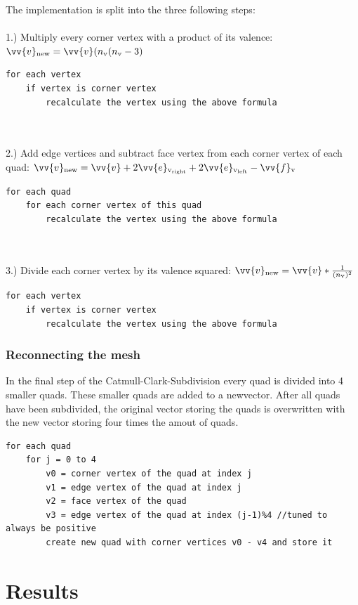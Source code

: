 \documentclass[12pt,a4paper]{scrartcl}
\begin{document}
The implementation is split into the three following steps:\\
\ \\
1.) Multiply every corner vertex with a product of its valence: $ \vv{v}\textsubscript{new} = \vv{v} (n\textsubscript{v}(n\textsubscript{v}-3)$
\begin{lstlisting}
for each vertex
	if vertex is corner vertex
		recalculate the vertex using the above formula
\end{lstlisting}
\ \\
\ \\
2.) Add edge vertices and subtract face vertex from each corner vertex of each quad: $\vv{v}\textsubscript{new} = \vv{v} + 2 \vv{e}\textsubscript{v\textsubscript{right}} + 2 \vv{e}\textsubscript{v\textsubscript{left}} - \vv{f}\textsubscript{v}$
\begin{lstlisting}
for each quad
	for each corner vertex of this quad
		recalculate the vertex using the above formula
\end{lstlisting}
\ \\
\ \\
3.) Divide each corner vertex by its valence squared: $ \vv{v}\textsubscript{new} = \vv{v} * \frac{1}{(n\textsubscript{v})^{2}}$
\begin{lstlisting}
for each vertex
	if vertex is corner vertex
		recalculate the vertex using the above formula
\end{lstlisting}

\subsubsection{Reconnecting the mesh}
In the final step of the Catmull-Clark-Subdivision every quad is divided into 4 smaller quads. These smaller quads are added to a newvector. After all quads have been subdivided, the original vector storing the quads is overwritten with the new vector storing four times the amout of quads.
\begin{lstlisting}
for each quad
	for j = 0 to 4
		v0 = corner vertex of the quad at index j
		v1 = edge vertex of the quad at index j
		v2 = face vertex of the quad
		v3 = edge vertex of the quad at index (j-1)%4 //tuned to always be positive
		create new quad with corner vertices v0 - v4 and store it
\end{lstlisting}

\section{Results}
\end{document}

